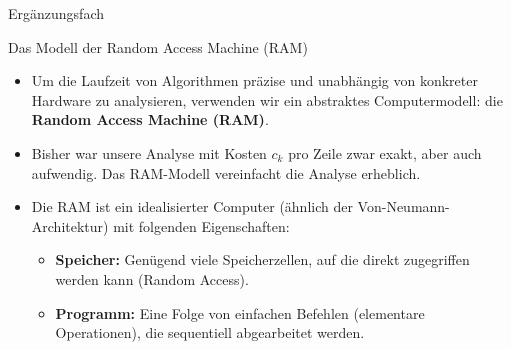 

\begin{frame}{Ergänzungsfach}
\end{frame}

\begin{frame}{Das Modell der Random Access Machine (RAM)}
	\begin{itemize}[<+->]
		\item Um die Laufzeit von Algorithmen präzise und unabhängig von konkreter Hardware zu analysieren, verwenden wir ein abstraktes Computermodell: die \textbf{Random Access Machine (RAM)}.
		\item Bisher war unsere Analyse mit Kosten $c_k$ pro Zeile zwar exakt, aber auch aufwendig. Das RAM-Modell vereinfacht die Analyse erheblich.
		\item Die RAM ist ein idealisierter Computer (ähnlich der Von-Neumann-Architektur) mit folgenden Eigenschaften:
		\begin{itemize}
			\item \textbf{Speicher:} Genügend viele Speicherzellen, auf die direkt zugegriffen werden kann (Random Access).
			\item \textbf{Programm:} Eine Folge von einfachen Befehlen (elementare Operationen), die sequentiell abgearbeitet werden.
		\end{itemize}
	\end{itemize}
\end{frame}

